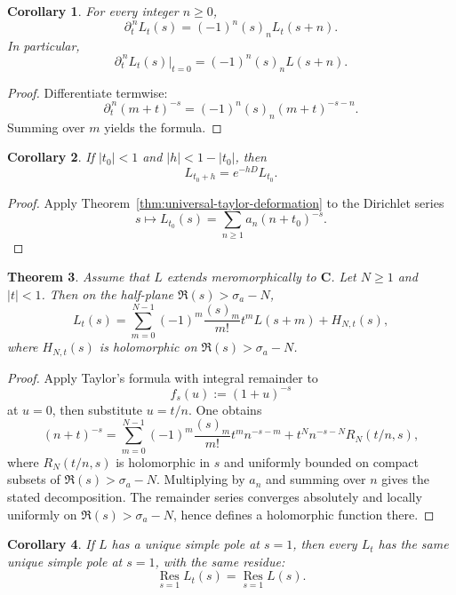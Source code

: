 \documentclass[11pt]{amsart}
\numberwithin{equation}{section}
\newtheorem{theorem}{Theorem}[section]
\newtheorem{corollary}[theorem]{Corollary}
\theoremstyle{definition}
\newcommand{\C}{\mathbf C}
\begin{document}
\begin{corollary}\label{cor:jets}
For every integer $n\ge0$,
\[
\boxed{
\partial_t^{\,n}L_t(s)=(-1)^n(s)_nL_t(s+n).
}
\]
In particular,
\[
\boxed{
\partial_t^{\,n}L_t(s)\big|_{t=0}=(-1)^n(s)_nL(s+n).
}
\]
\end{corollary}

\begin{proof}
Differentiate termwise:
\[
\partial_t^{\,n}(m+t)^{-s}=(-1)^n(s)_n(m+t)^{-s-n}.
\]
Summing over $m$ yields the formula. 
\end{proof}

\begin{corollary}\label{cor:semigroup-law}
If $|t_0|<1$ and $|h|<1-|t_0|$, then
\[
L_{t_0+h}=e^{-hD}L_{t_0}.
\]
\end{corollary}

\begin{proof}
Apply Theorem~\ref{thm:universal-taylor-deformation} to the Dirichlet series
\[
s\longmapsto L_{t_0}(s)=\sum_{n\ge1}a_n(n+t_0)^{-s}.
\]

\end{proof}

\begin{theorem}\label{thm:meromorphic-continuation-shifted-tower}
Assume that $L$ extends meromorphically to $\C$. Let $N\ge1$ and $|t|<1$. Then on the half-plane $\Re(s)>\sigma_a-N$,
\[
\boxed{
L_t(s)=
\sum_{m=0}^{N-1}(-1)^m\frac{(s)_m}{m!}t^mL(s+m)
+
H_{N,t}(s),
}
\]
where $H_{N,t}(s)$ is holomorphic on $\Re(s)>\sigma_a-N$.
\end{theorem}

\begin{proof}
Apply Taylor's formula with integral remainder to
\[
f_s(u):=(1+u)^{-s}
\]
at $u=0$, then substitute $u=t/n$. One obtains
\[
(n+t)^{-s}
=
\sum_{m=0}^{N-1}(-1)^m\frac{(s)_m}{m!}t^m n^{-s-m}
+
t^N n^{-s-N}R_N(t/n,s),
\]
where $R_N(t/n,s)$ is holomorphic in $s$ and uniformly bounded on compact subsets of $\Re(s)>\sigma_a-N$. Multiplying by $a_n$ and summing over $n$ gives the stated decomposition. The remainder series converges absolutely and locally uniformly on $\Re(s)>\sigma_a-N$, hence defines a holomorphic function there. 
\end{proof}

\begin{corollary}\label{cor:pole-rigidity}
If $L$ has a unique simple pole at $s=1$, then every $L_t$ has the same unique simple pole at $s=1$, with the same residue:
\[
\operatorname*{Res}_{s=1}L_t(s)=\operatorname*{Res}_{s=1}L(s).
\]
\end{corollary}
\end{document}
